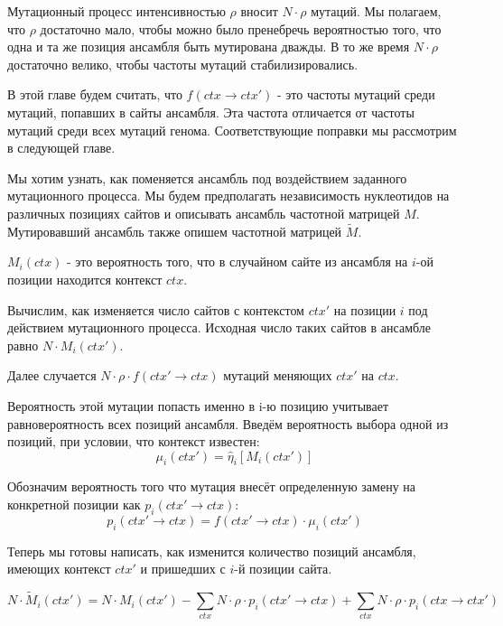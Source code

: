 \documentclass[a4paper]{article}
\begin{document}
Мутационный процесс интенсивностью $\rho$ вносит $N\cdot\rho$ мутаций. Мы полагаем, что $\rho$ достаточно мало, чтобы можно было пренебречь вероятностью того, что одна и та же позиция ансамбля быть мутирована дважды. В то же время $N\cdot\rho$ достаточно велико, чтобы частоты мутаций стабилизировались.

В этой главе будем считать, что $f(ctx\to ctx')$ - это частоты мутаций среди мутаций, попавших в сайты ансамбля. Эта частота отличается от частоты мутаций среди всех мутаций генома. Соответствующие поправки мы рассмотрим в следующей главе.

Мы хотим узнать, как поменяется ансамбль под воздействием заданного мутационного процесса. Мы будем предполагать независимость нуклеотидов на различных позициях сайтов и описывать ансамбль частотной матрицей $M$. Мутировавший ансамбль также опишем частотной матрицей $\widetilde{M}$.

$M_i(ctx)$ - это вероятность того, что в случайном сайте из ансамбля на $i$-ой позиции находится контекст $ctx$.

Вычислим, как изменяется число сайтов с контекстом $ctx'$ на позиции $i$ под действием мутационного процесса. Исходная число таких сайтов в ансамбле равно $N\cdot M_i(ctx')$. 

Далее случается $N\cdot\rho\cdot f(ctx' \to ctx)$ мутаций меняющих $ctx'$ на $ctx$.

Вероятность этой мутации попасть именно в i-ю позицию учитывает равновероятность всех позиций ансамбля. Введём вероятность выбора одной из позиций, при условии, что контекст известен:
\begin{equation}
\mu_i(ctx') = \widehat{\eta}_i \left[ M_i(ctx') \right] 
\end{equation}


Обозначим вероятность того что мутация внесёт определенную замену на конкретной позиции как $p_i(ctx' \to ctx)$:
\begin{equation}
p_i(ctx' \to ctx) = f(ctx' \to ctx)\cdot\mu_i(ctx')
\end{equation}

Теперь мы готовы написать, как изменится количество позиций ансамбля, имеющих контекст $ctx'$ и пришедших с $i$-й позиции сайта.

\begin{equation}
N\cdot\widetilde{M}_i(ctx') = N\cdot M_i(ctx') - \sum_{ctx} N\cdot\rho\cdot p_i(ctx' \to ctx) + \sum_{ctx} N\cdot\rho\cdot p_i(ctx \to ctx')
\end{equation}
\end{document}
